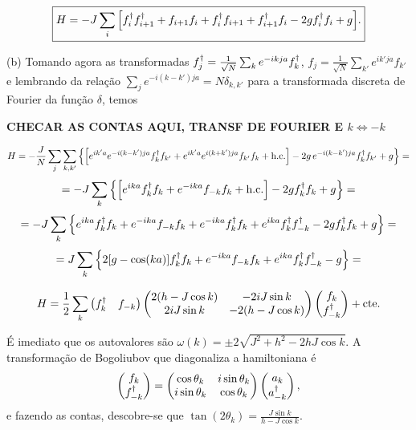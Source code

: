 \documentclass[a4paper,10pt]{article}
\begin{document}
\begin{equation} \label{eq:hamil_transvising}
\boxed{ H =
-J \sum_{i} \qty[ f_i^\dagger f_{i+1}^\dagger + f_{i+1} f_i + f_i^\dagger f_{i+1} + f_{i+1}^\dagger f_i - 2 g f_i^\dagger f_i + g]. }
\end{equation}

\n\n

(b) Tomando agora as transformadas $f_j^\dagger = \frac{1}{\sqrt{N}} \sum_{k} e^{-ikja} f_k^\dagger$, $f_j = \frac{1}{\sqrt{N}} \sum_{k'} e^{ik'ja} f_{k'}$ e lembrando da relação $\sum_{j} e^{-i(k-k')ja} = N \delta_{k,k'}$ para a transformada discreta de Fourier da função $\delta$, temos

\n
\textbf{CHECAR AS CONTAS AQUI, TRANSF DE FOURIER E $k \iff -k$}
\n

$$
H =
-\frac{J}{N} \sum_{j} \sum_{k,k'} \qty{ \qty[ e^{ik'a} e^{-i(k-k')ja} f_k^\dagger f_{k'} + e^{ik'a} e^{i(k+k')ja} f_{k'} f_k + \text{h.c.}] - 2g \, e^{-i(k-k')ja} f_k^\dagger f_{k'} + g} =
$$
$$
=
-J \sum_{k} \qty{ \qty[ e^{ika} f_k^\dagger f_{k} + e^{-ika} f_{-k} f_k + \text{h.c.}]
- 2 g f_k^\dagger f_k + g } =
$$
$$
=
-J \sum_{k} \qty{ e^{ika} f_k^\dagger f_{k} + e^{-ika} f_{-k} f_k + e^{-ika} f_k^\dagger f_{k} + e^{ika} f_{k}^\dagger f_{-k}^\dagger- 2 g f_k^\dagger f_k + g } =
$$
$$
=
J \sum_{k} \qty{ 2 \qty[g - \cos(ka)] f_k^\dagger f_{k} + e^{-ika} f_{-k} f_k + e^{ika} f_{k}^\dagger f_{-k}^\dagger- g } =
$$

\n\n\n\n\n\n
$$
H =
\frac{1}{2}
\sum_{k}
\begin{pmatrix}
f_k^\dagger & f_{-k}
\end{pmatrix}
\begin{pmatrix}
2(h - J \cos k) & -2iJ \sin k \\
2iJ \sin k & -2(h - J\cos k)
\end{pmatrix}
\begin{pmatrix}
f_k \\ f_{-k}^\dagger
\end{pmatrix}
+ \text{cte}.
$$

É imediato que os autovalores são $\omega(k) = \pm 2\sqrt{J^2 + h^2 - 2hJ \cos k}$. A transformação de Bogoliubov que diagonaliza a hamiltoniana é
$$
\begin{pmatrix}
f_k \\ f_{-k}^\dagger
\end{pmatrix}
=
\begin{pmatrix}
 \cos \theta_k & i\sin \theta_k  \\
i\sin \theta_k &  \cos \theta_k
\end{pmatrix}
\begin{pmatrix}
a_k \\ a_{-k}^\dagger
\end{pmatrix},
$$
e fazendo as contas, descobre-se que $\tan(2\theta_k) = \frac{J \sin k}{h - J \cos k}$.
\end{document}
